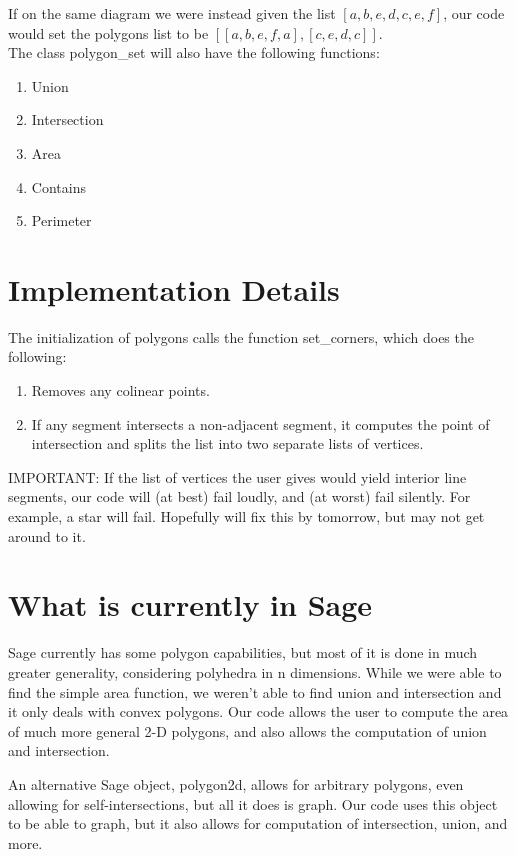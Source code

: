 \documentclass[11pt]{amsart}
\theoremstyle{definition}
\theoremstyle{remark}
\numberwithin{equation}{section}
\begin{document}
If on the same diagram we were instead given the list $[a,b,e,d,c,e,f]$, our code would set the polygons list to be 
$[[a,b,e,f,a], [c,e,d,c]]. $
\\
The class polygon\_set will also have the following functions:

\begin{enumerate}
\item{Union }
\item{Intersection}
\item{Area}
\item{Contains}
\item{Perimeter}
\end{enumerate}


\section{Implementation Details}
The initialization of polygons calls the function set\_corners, which does the following:
\begin{enumerate}
\item{Removes any colinear points.}
\item{If any segment intersects a non-adjacent segment, it computes the point of intersection and splits the list into two separate lists of vertices.}

\end{enumerate}

IMPORTANT: If the list of vertices the user gives would yield interior line segments, our code will (at best) fail loudly, and (at worst) fail silently. For example, a star will fail. Hopefully will fix this by tomorrow, but may not get around to it.

\section{What is currently in Sage}
Sage currently has some polygon capabilities, but most of it is done in much greater generality, considering polyhedra in n dimensions. While we were able to find the simple area function, we weren't able to find union and intersection and it only deals with convex polygons. Our code allows the user to compute the area of much more general 2-D polygons, and also allows the computation of union and intersection.

An alternative Sage object, polygon2d, allows for arbitrary polygons, even allowing for self-intersections, but all it does is graph. Our code uses this object to be able to graph, but it also allows for computation of intersection, union, and more.
\end{document}
